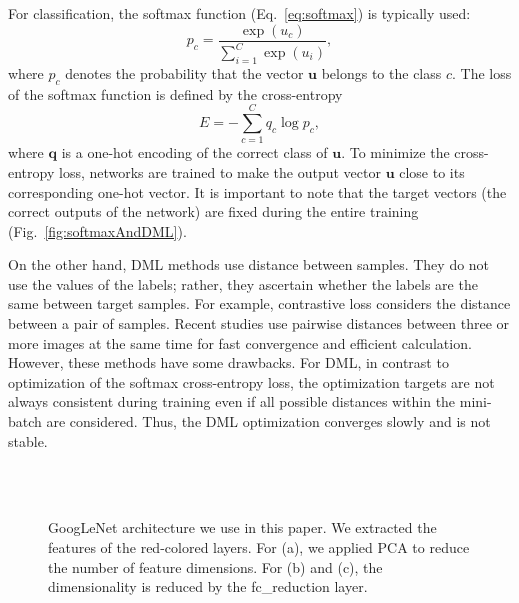 \documentclass[9pt,technote,compsoc]{./sty/IEEEtran}
\newcommand{\Eref}[1]{Eq.~\ref{#1}}
\newcommand{\Fref}[1]{Fig.~\ref{#1}}
\begin{document}
For classification, the softmax function (\Eref{eq:softmax}) is typically used:
\begin{equation}
\label{eq:softmax}
p_c=\frac{\exp(u_c)}{\sum_{i=1}^{C} \exp(u_i)},
\end{equation}
where $p_c$ denotes the probability that the vector $\mathbf{u}$ belongs to the class $c$.
The loss of the softmax function is defined by the cross-entropy
\begin{equation}
E=-\sum_{c=1}^{C} q_c\log p_c,
\end{equation}
where $\mathbf{q}$ is a one-hot encoding of the correct class of $\mathbf{u}$.
To minimize the cross-entropy loss, networks are trained to make the output vector $\mathbf{u}$ close to its corresponding one-hot vector.
It is important to note that the target vectors (the correct outputs of the network) are fixed during the entire training (\Fref{fig:softmaxAndDML}).

On the other hand, DML methods use distance between samples.
They do not use the values of the labels; rather, they ascertain whether the labels are the same between target samples.
For example, contrastive loss \cite{hadsell2006dimensionality} considers the distance between a pair of samples. 
Recent studies \cite{schroff2015facenet}\cite{song2016deep}\cite{song2017learnable}\cite{sohn2016improved} use pairwise distances between three or more images at the same time for fast convergence and efficient calculation.
However, these methods have some drawbacks.
For DML, in contrast to optimization of the softmax cross-entropy loss, the optimization targets are not always consistent during training even if all possible distances within the mini-batch are considered.
Thus, the DML optimization converges slowly and is not stable.



\begin{figure}[t]
	\centering
	\\
	\\
	\caption{	GoogLeNet \cite{szegedy2015going} architecture we use in this paper. We extracted the features of the red-colored layers. For (a), we applied PCA to reduce the number of feature dimensions. For (b) and (c), the dimensionality is reduced by the fc\_reduction layer.}
\end{figure}
\end{document}
